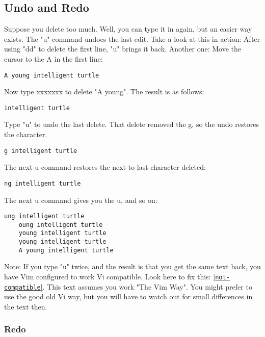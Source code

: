 \subsection{Undo and Redo}
\label{Undo and Redo}

Suppose you delete too much.
Well, you can type it in again, but an easier way exists.
The "u" command undoes the last edit.
Take a look at this in action: After using "dd" to delete the first line, "u" brings it back.
Another one: Move the cursor to the A in the first line: 

		\begin{Verbatim}[samepage=true]
		A young intelligent turtle 
						\end{Verbatim}

Now type xxxxxxx to delete "A young".
The result is as follows: 

	\begin{Verbatim}[samepage=true]
	intelligent turtle 
	\end{Verbatim}

Type "u" to undo the last delete.
That delete removed the g, so the undo restores the character.

	\begin{Verbatim}[samepage=true]
	g intelligent turtle 
	\end{Verbatim}

The next u command restores the next-to-last character deleted:

	\begin{Verbatim}[samepage=true]
	ng intelligent turtle 
	\end{Verbatim}

The next u command gives you the u, and so on:

	\begin{Verbatim}[samepage=true]
	ung intelligent turtle 
	oung intelligent turtle 
	young intelligent turtle 
	young intelligent turtle 
	A young intelligent turtle 
	\end{Verbatim}

Note:
If you type "u" twice, and the result is that you get the same text back, you have Vim configured to work Vi compatible.
Look here to fix this: \hyperref[not-compatible]{|\texttt{not-compatible}|}.
This text assumes you work "The Vim Way".
You might prefer to use the good old Vi way, but you will have to watch out for small differences in the text then.

\subsubsection{Redo}

